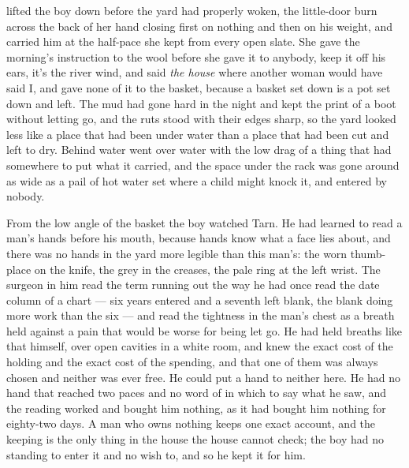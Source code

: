  lifted the boy down before the yard had properly woken, the little-door burn across the back of her hand closing first on nothing and then on his weight, and carried him at the half-pace she kept from every open slate. She gave the morning's instruction to the wool before she gave it to anybody, keep it off his ears, it's the river wind, and said \emph{the house} where another woman would have said I, and gave none of it to the basket, because a basket set down is a pot set down and left. The mud had gone hard in the night and kept the print of a boot without letting go, and the ruts stood with their edges sharp, so the yard looked less like a place that had been under water than a place that had been cut and left to dry. Behind  water went over water with the low drag of a thing that had somewhere to put what it carried, and the space under the rack was gone around as wide as a pail of hot water set where a child might knock it, and entered by nobody.

From the low angle of the basket the boy watched Tarn. He had learned to read a man's hands before his mouth, because hands know what a face lies about, and there was no hands in the yard more legible than this man's: the worn thumb-place on the knife, the grey in the creases, the pale ring at the left wrist. The surgeon in him read the term running out the way he had once read the date column of a chart --- six years entered and a seventh left blank, the blank doing more work than the six --- and read the tightness in the man's chest as a breath held against a pain that would be worse for being let go. He had held breaths like that himself, over open cavities in a white room, and knew the exact cost of the holding and the exact cost of the spending, and that one of them was always chosen and neither was ever free. He could put a hand to neither here. He had no hand that reached two paces and no word of  in which to say what he saw, and the reading worked and bought him nothing, as it had bought him nothing for eighty-two days. A man who owns nothing keeps one exact account, and the keeping is the only thing in the house the house cannot check; the boy had no standing to enter it and no wish to, and so he kept it for him.

\scenebreak

